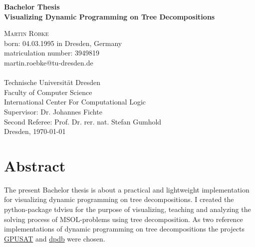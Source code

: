 \documentclass[a4paper, 12pt]{scrartcl}
\begin{document}
\begin{titlepage}
	\begin{center}
		{\Large\bfseries Bachelor Thesis}           \\[6.5ex]
		
		{\huge\bfseries Visualizing Dynamic Programming on Tree Decompositions}                  \\[6.5ex]
		
		\vspace{6ex}
				
		\textsc{\Large Martin Röbke}    \\[3ex]
		{\Large born: 04.03.1995 in Dresden, Germany}    \\[2ex]
		{\Large matriculation number: 3949819}    \\[2ex]
		{\Large martin.roebke@tu-dresden.de}    \\[2ex]
		\textsc{\large 
			}             \\[12ex]
		\vfill
		{\Large Technische Universität Dresden}               \\
		Faculty of Computer Science \\
		International Center For Computational Logic 		\\[5ex]
		
		{\Large Supervisor: Dr. Johannes Fichte}\\[2ex]
		{\Large Second Referee:  Prof. Dr. rer. nat. Stefan Gumhold}\\[5ex]
		
		\vfill
		Dresden, \today
	\end{center}
\end{titlepage}



\section*{Abstract}
\vspace{4ex}
The present Bachelor thesis is about a practical and lightweight implementation for visualizing dynamic programming on tree decompositions.
I created the python-package tdvisu for the purpose of visualizing, teaching and analyzing the solving process of MSOL-problems using tree decomposition.
As two reference implementations of dynamic programming on tree decompositions the projects \href{https://github.com/daajoe/GPUSAT}{GPUSAT} and \href{https://github.com/hmarkus/dp_on_dbs}{dpdb} were chosen.
\end{document}
